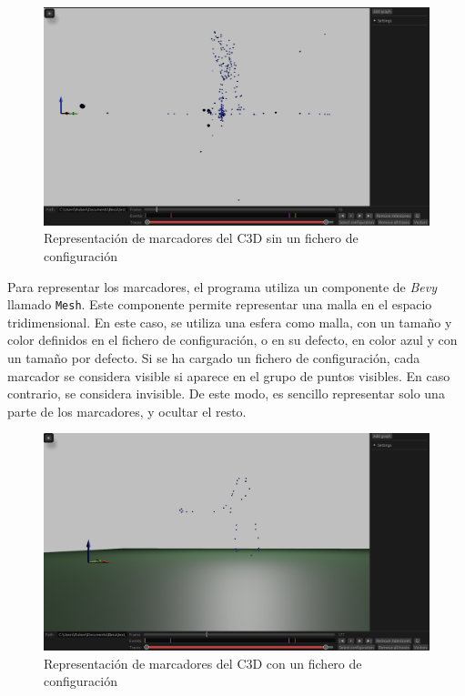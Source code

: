 \begin{figure}[H]
  \centering
  \includegraphics[width=\textwidth]{imagenes/marcadores.png}
  \caption{Representación de marcadores del \acs{C3D} sin un fichero de configuración}
  \label{fig:marcadores}
\end{figure}

Para representar los marcadores, el programa utiliza un componente de \textit{Bevy} llamado \texttt{Mesh}. Este componente permite representar una malla en el espacio tridimensional. En este caso, se utiliza una esfera como malla, con un tamaño y color definidos en el fichero de configuración, o en su defecto, en color azul y con un tamaño por defecto. Si se ha cargado un fichero de configuración, cada marcador se considera visible si aparece en el grupo de puntos visibles. En caso contrario, se considera invisible. De este modo, es sencillo representar solo una parte de los marcadores, y ocultar el resto.

\begin{figure}[H]
  \centering
  \includegraphics[width=\textwidth]{imagenes/config-basica.png}
  \caption{Representación de marcadores del \acs{C3D} con un fichero de configuración}
  \label{fig:cfg-basica}
\end{figure}

